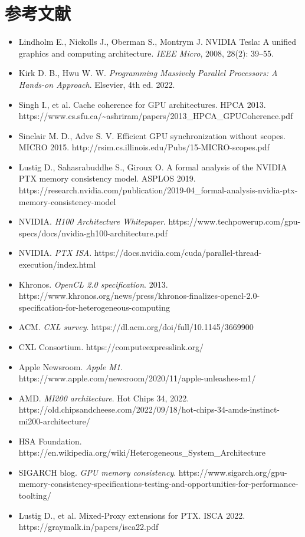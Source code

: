 \section*{参考文献}
\begin{itemize}
\item Lindholm E., Nickolls J., Oberman S., Montrym J. NVIDIA Tesla: A unified graphics and computing architecture. \emph{IEEE Micro}, 2008, 28(2): 39–55.
\item Kirk D. B., Hwu W. W. \emph{Programming Massively Parallel Processors: A Hands-on Approach}. Elsevier, 4th ed. 2022.
\item Singh I., et al. Cache coherence for GPU architectures. HPCA 2013. https://www.cs.sfu.ca/\textasciitilde{}ashriram/papers/2013\_HPCA\_GPUCoherence.pdf
\item Sinclair M. D., Adve S. V. Efficient GPU synchronization without scopes. MICRO 2015. http://rsim.cs.illinois.edu/Pubs/15-MICRO-scopes.pdf
\item Lustig D., Sahasrabuddhe S., Giroux O. A formal analysis of the NVIDIA PTX memory consistency model. ASPLOS 2019. https://research.nvidia.com/publication/2019-04\_formal-analysis-nvidia-ptx-memory-consistency-model
\item NVIDIA. \emph{H100 Architecture Whitepaper}. https://www.techpowerup.com/gpu-specs/docs/nvidia-gh100-architecture.pdf
\item NVIDIA. \emph{PTX ISA}. https://docs.nvidia.com/cuda/parallel-thread-execution/index.html
\item Khronos. \emph{OpenCL 2.0 specification}. 2013. https://www.khronos.org/news/press/khronos-finalizes-opencl-2.0-specification-for-heterogeneous-computing
\item ACM. \emph{CXL survey}. https://dl.acm.org/doi/full/10.1145/3669900
\item CXL Consortium. https://computeexpresslink.org/
\item Apple Newsroom. \emph{Apple M1}. https://www.apple.com/newsroom/2020/11/apple-unleashes-m1/
\item AMD. \emph{MI200 architecture}. Hot Chips 34, 2022. https://old.chipsandcheese.com/2022/09/18/hot-chips-34-amds-instinct-mi200-architecture/
\item HSA Foundation. https://en.wikipedia.org/wiki/Heterogeneous\_System\_Architecture
\item SIGARCH blog. \emph{GPU memory consistency}. https://www.sigarch.org/gpu-memory-consistency-specifications-testing-and-opportunities-for-performance-toolting/
\item Lustig D., et al. Mixed-Proxy extensions for PTX. ISCA 2022. https://graymalk.in/papers/isca22.pdf
\end{itemize}
